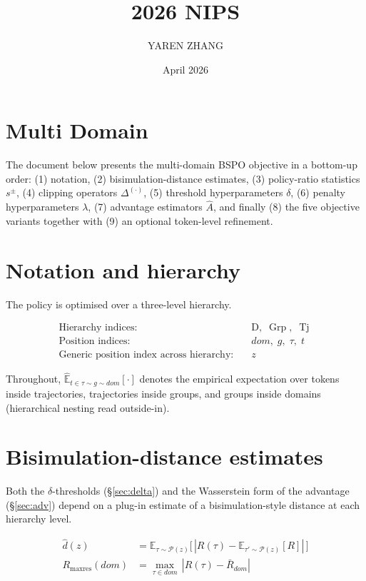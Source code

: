 \documentclass{article}
\title{2026 NIPS}
\author{YAREN ZHANG}
\date{April 2026}
\newcommand{\Ehat}{\widehat{\mathbb{E}}}
\begin{document}
\maketitle

\section{Multi Domain}

The document below presents the multi-domain BSPO objective in a bottom-up
order: (1) notation, (2) bisimulation-distance estimates, (3) policy-ratio
statistics $s^{\pm}$, (4) clipping operators $\Delta^{(\cdot)}$, (5) threshold
hyperparameters $\delta$, (6) penalty hyperparameters $\lambda$, (7) advantage
estimators $\hat A$, and finally (8) the five objective variants together with
(9) an optional token-level refinement.

\section{Notation and hierarchy}

The policy is optimised over a three-level hierarchy.

\begin{align*}
\text{Hierarchy indices:}\quad & \text{D}, \; \operatorname{Grp}, \; \operatorname{Tj} \\
\text{Position indices:}\quad & dom, \; g, \; \tau, \; t \\
\text{Generic position index across hierarchy:}\quad & z
\end{align*}

Throughout, $\Ehat_{t\in\tau\sim g\sim dom}[\cdot]$ denotes the empirical
expectation over tokens inside trajectories, trajectories inside groups, and
groups inside domains (hierarchical nesting read outside-in).

\section{Bisimulation-distance estimates}

Both the $\delta$-thresholds (\S\ref{sec:delta}) and the Wasserstein form of
the advantage (\S\ref{sec:adv}) depend on a plug-in estimate of a
bisimulation-style distance at each hierarchy level.

\begin{align*}
\hat d(z) &= \mathbb{E}_{\tau \sim \mathcal{P}(z)}\bigl[\,|R(\tau) - \mathbb{E}_{\tau' \sim \mathcal{P}(z)}[R]|\,\bigr] \\[3pt]
R_{\max\text{res}}(dom) &= \max_{\tau \in dom}\,|R(\tau) - \bar R_{dom}|
\end{align*}
\end{document}

